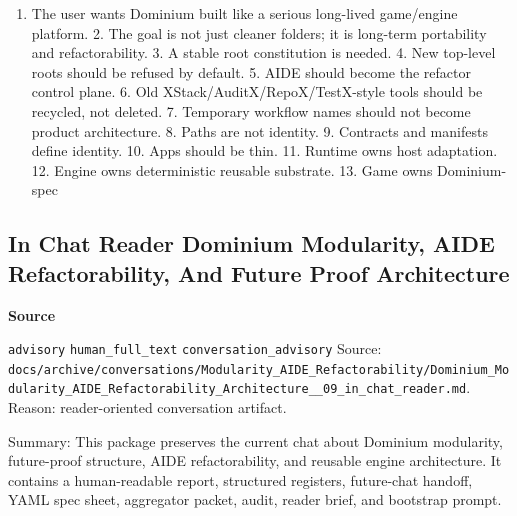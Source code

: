 \documentclass[9pt,a4paper,openany]{book}
\newcommand{\vonecallout}[3]{\par\medskip\noindent\begingroup\setlength{\fboxsep}{7pt}\colorbox{DomCalloutBg}{\parbox{0.94\linewidth}{\textbf{\textcolor{#1}{#2}}\par #3}}\endgroup\par\medskip}
\begin{document}
\begin{enumerate}
\item The user wants Dominium built like a serious long-\allowbreak{}lived game/\allowbreak{}engine platform.\allowbreak{} 2.\allowbreak{} The goal is not just cleaner folders; it is long-\allowbreak{}term portability and refactorability.\allowbreak{} 3.\allowbreak{} A stable root constitution is needed.\allowbreak{} 4.\allowbreak{} New top-\allowbreak{}level roots should be refused by default.\allowbreak{} 5.\allowbreak{} AIDE should become the refactor control plane.\allowbreak{} 6.\allowbreak{} Old XStack/\allowbreak{}AuditX/\allowbreak{}RepoX/\allowbreak{}TestX-\allowbreak{}style tools should be recycled, not deleted.\allowbreak{} 7.\allowbreak{} Temporary workflow names should not become product architecture.\allowbreak{} 8.\allowbreak{} Paths are not identity.\allowbreak{} 9.\allowbreak{} Contracts and manifests define identity.\allowbreak{} 10.\allowbreak{} Apps should be thin.\allowbreak{} 11.\allowbreak{} Runtime owns host adaptation.\allowbreak{} 12.\allowbreak{} Engine owns deterministic reusable substrate.\allowbreak{} 13.\allowbreak{} Game owns Dominium-\allowbreak{}spec
\end{enumerate}


\subsection{In Chat Reader Dominium Modularity, AIDE Refactorability, And Future Proof Architecture}

\vonecallout{DomSlate}{Source}{\texttt{advisory} \texttt{human\_\allowbreak{}full\_\allowbreak{}text} \texttt{conversation\_\allowbreak{}advisory} Source: \texttt{docs/\allowbreak{}archive/\allowbreak{}conversations/\allowbreak{}Modularity\_\allowbreak{}AIDE\_\allowbreak{}Refactorability/\allowbreak{}Dominium\_\allowbreak{}Modularity\_\allowbreak{}AIDE\_\allowbreak{}Refactorability\_\allowbreak{}Architecture\_\allowbreak{}\_\allowbreak{}09\_\allowbreak{}in\_\allowbreak{}chat\_\allowbreak{}reader.\allowbreak{}md}.\allowbreak{} Reason: reader-\allowbreak{}oriented conversation artifact.\allowbreak{}}

Summary: This package preserves the current chat about Dominium modularity, future-\allowbreak{}proof structure, AIDE refactorability, and reusable engine architecture.\allowbreak{} It contains a human-\allowbreak{}readable report, structured registers, future-\allowbreak{}chat handoff, YAML spec sheet, aggregator packet, audit, reader brief, and bootstrap prompt.\allowbreak{}
\end{document}
